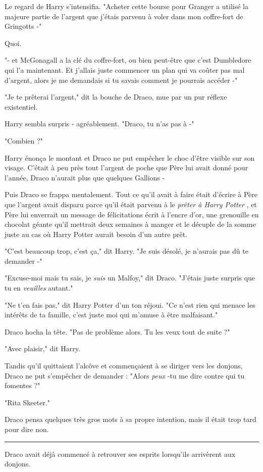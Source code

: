 Le regard de Harry s'intensifia. "Acheter cette bourse pour Granger a utilisé la majeure partie de l'argent que j'étais parvenu à voler dans mon coffre-fort de Gringotts -"

Quoi.

"- et McGonagall a la clé du coffre-fort, ou bien peut-être que c'est Dumbledore qui l'a maintenant. Et j'allais juste commencer un plan qui va coûter pas mal d'argent, alors je me demandais si tu savais comment je pourrais accéder -"

"Je te prêterai l'argent," dit la bouche de Draco, mue par un pur réflexe existentiel.

Harry sembla surpris - agréablement. "Draco, tu n'as pas à -"

"Combien ?"

Harry énonça le montant et Draco ne put empêcher le choc d'être visible sur son visage. C'était à peu près tout l'argent de poche que Père lui avait donné pour l'année, Draco n'aurait plus que quelques Gallions -

Puis Draco se frappa mentalement. Tout ce qu'il avait à faire était d'écrire à Père que l'argent avait disparu parce qu'il était parvenu à le \emph{prêter à Harry Potter} , et Père lui enverrait un message de félicitations écrit à l'encre d'or, une grenouille en chocolat géante qu'il mettrait deux semaines à manger et le décuple de la somme juste au cas où Harry Potter aurait besoin d'un autre prêt.

"C'est beaucoup trop, c'est ça," dit Harry. "Je suis désolé, je n'aurais pas dû te demander -"

"Excuse-moi mais tu sais, je \emph{suis}  un Malfoy," dit Draco. "J'étais juste surpris que tu en \emph{veuilles}  autant."

"Ne t'en fais pas," dit Harry Potter d'un ton réjoui. "Ce n'est rien qui menace les intérêts de ta famille, c'est juste moi qui m'amuse à être malfaisant."

Draco hocha la tête. "Pas de problème alors. Tu les veux tout de suite ?"

"Avec plaisir," dit Harry.

Tandis qu'il quittaient l'alcôve et commençaient à se diriger vers les donjons, Draco ne put s'empêcher de demander : "Alors \emph{peux} -tu me dire contre qui tu fomentes ?"

"Rita Skeeter."

Draco pensa quelques très gros mots à sa propre intention, mais il était trop tard pour dire non.
\par\noindent\rule{\textwidth}{0.4pt}
Draco avait déjà commencé à retrouver ses esprits lorsqu'ils arrivèrent aux donjons.

